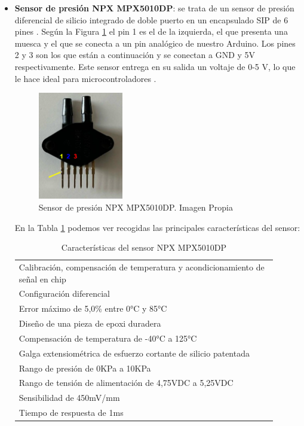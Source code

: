 \begin{itemize}
    \item \textbf{Sensor de presión NPX MPX5010DP}: se trata de un sensor de presión diferencial de silicio integrado de doble puerto en un encapsulado SIP de 6 pines \cite{npx}. Según la Figura \ref{fig:sensor_pres} el pin 1 es el de la izquierda, el que presenta una muesca y el que se conecta a un pin analógico de nuestro Arduino. Los pines 2 y 3 son los que están a continuación y se conectan a GND y 5V respectivamente. Este sensor entrega en su salida un voltaje de 0-5 V, lo que le hace ideal para microcontroladores \cite{npx_}. 
    \begin{figure}[h]
    \centering
    \includegraphics[width=0.35\textwidth]{img/sensor_1.PNG}
    \caption{Sensor de presión NPX MPX5010DP. Imagen Propia}
    \label{fig:sensor_pres}
    \end{figure}
    En la Tabla \ref{tab:caracteristicas_sensor} podemos ver recogidas las principales características del sensor:
    
    \begin{table}[htbp]
    \centering
    \begin{tabular}{>{\raggedright\arraybackslash}p{0.9\linewidth}}
    \hline
    \rowcolor{blue!20}
    \multicolumn{1}{c}{\textbf{Características del sensor NPX MPX5010DP}} \\
    \hline
    Calibración, compensación de temperatura y acondicionamiento de señal en chip \\
    Configuración diferencial \\
    Error máximo de 5,0\% entre 0°C y 85°C \\
    Diseño de una pieza de epoxi duradera \\
    Compensación de temperatura de -40°C a 125°C \\
    Galga extensiométrica de esfuerzo cortante de silicio patentada \\
    Rango de presión de 0KPa a 10KPa \\
    Rango de tensión de alimentación de 4,75VDC a 5,25VDC \\
    Sensibilidad de 450mV/mm \\
    Tiempo de respuesta de 1ms \\
    \hline
    \end{tabular}
    \caption{Características del sensor NPX MPX5010DP \cite{npx}}
    \label{tab:caracteristicas_sensor}
    \end{table}
    


\end{itemize}
